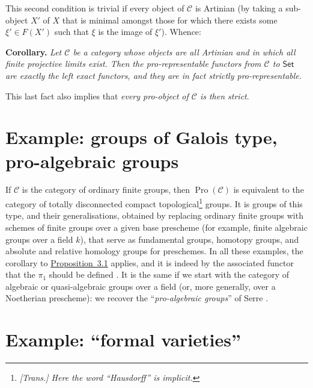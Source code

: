 \documentclass{article}
\newenvironment{itenv}[1]
  {\phantomsection\par\medskip\noindent\textbf{#1.}\itshape}
  {\medskip}
\renewcommand{\cal}[1]{{\mathcal{#1}}}
\newcommand{\Set}{\mathsf{Set}}
\DeclareMathOperator{\Pro}{Pro}
\begin{document}
This second condition is trivial if every object of $\cal{C}$ is Artinian (by taking a sub-object $X'$ of $X$ that is minimal amongst those for which there exists some $\xi'\in F(X')$ such that $\xi$ is the image of $\xi'$).
Whence:

\begin{itenv}{Corollary}
  Let $\cal{C}$ be a category whose objects are all Artinian and in which all finite projective limits exist.
  Then the pro-representable functors from $\cal{C}$ to $\Set$ are exactly the left exact functors, and they are in fact strictly pro-representable.
\end{itenv}

This last fact also implies that \emph{every pro-object of $\cal{C}$ is then strict}.


\section{Example: groups of Galois type, pro-algebraic groups}
\label{A.4}

If $\cal{C}$ is the category of ordinary finite groups, then $\Pro(\cal{C})$ is equivalent to the category of totally disconnected compact topological\footnote{\emph{[Trans.] Here the word ``Hausdorff'' is implicit.}} groups.
It is groups of this type, and their generalisations, obtained by replacing ordinary finite groups with schemes of finite groups over a given base prescheme (for example, finite algebraic groups over a field $k$), that serve as fundamental groups, homotopy groups, and absolute and relative homology groups for preschemes.
In all these examples, the corollary to \hyperref[A.3-proposition1]{Proposition~3.1} applies, and it is indeed by the associated functor that the $\pi_1$ should be defined \cite{2}.
It is the same if we start with the category of algebraic or quasi-algebraic groups over a field (or, more generally, over a Noetherian prescheme): we recover the ``\emph{pro-algebraic groups}'' of Serre \cite{4}.


\section{Example: ``formal varieties''}
\label{A.5}
\end{document}
